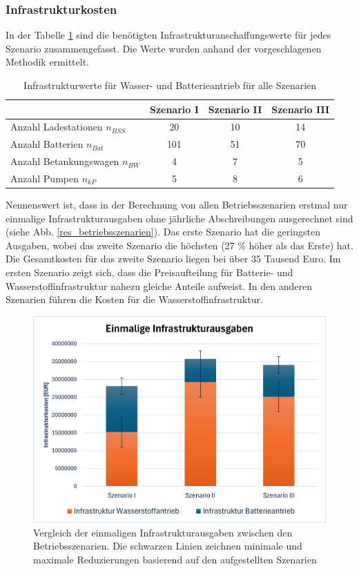 \subsubsection{Infrastrukturkosten}
In der Tabelle \ref{Infrastrukturwerte_res} sind die benötigten 
Infrastrukturanschaffungswerte für jedes Szenario zusammengefasst. 
Die Werte wurden anhand der vorgeschlagenen Methodik ermittelt.\\
%
\begin{table}[h]
	\begin{center}
    \caption{Infrastrukturwerte für Wasser- und Batterieantrieb für alle Szenarien}
	\label{Infrastrukturwerte_res}
	\begin{tabular}{|l|c|c|c|}
		\hline
		 & \textbf{Szenario I}& \textbf{Szenario II}& \textbf{Szenario III} \\ \hline
		Anzahl Ladestationen $n_{BSS}$ & 20 & 10& 14\\ \hline
		Anzahl Batterien $n_{Bat}$ & 101 & 51& 70 \\ \hline
		Anzahl Betankungswagen $n_{BW}$ & 4 & 7 & 5\\ \hline
		Anzahl Pumpen $n_{kP}$  & 5 & 8 & 6\\ \hline
	\end{tabular}
    \end{center}
\end{table}
%
Nennenswert ist, dass in der Berechnung von allen Betriebsszenarien erstmal nur einmalige Infrastrukturausgaben 
ohne jährliche Abschreibungen ausgerechnet sind (siehe Abb. \ref{res_betriebsszenarien}). 
Das erste Szenario hat die geringsten Ausgaben, wobei das zweite Szenario die höchsten (27 \% höher als das Erste) hat.
Die Gesamtkosten für das zweite Szenario liegen bei über 35 Tausend Euro. %
Im ersten Szenario zeigt sich, dass die Preisaufteilung für Batterie- und Wasserstoffinfrastruktur nahezu gleiche Anteile aufweist.
In den anderen Szenarien führen die Kosten für die Wasserstoffinfrastruktur.\\
\begin{figure}[h]
	\centering
	\includegraphics[width=0.8\linewidth]{Bilder/Infr_Szenarien.png}
	\caption[Vergleich der einmaligen Infrastrukturausgaben zwischen den Betriebsszenarien]{Vergleich der einmaligen Infrastrukturausgaben zwischen den Betriebsszenarien. Die schwarzen Linien
	zeichnen minimale und maximale Reduzierungen basierend auf den aufgestellten Szenarien}
	\label{res_infr_betriebsszenarien}
\end{figure}
